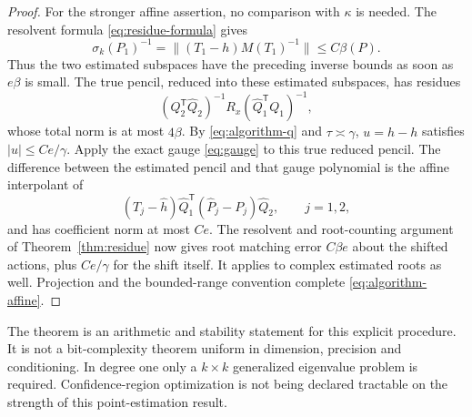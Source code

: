 \begin{proof}
For the stronger affine assertion, no comparison with $\kappa$ is
needed. The resolvent formula \eqref{eq:residue-formula} gives
\[
 \sigma_k(P_1)^{-1}
       =\|(T_1-h)M(T_1)^{-1}\|\le C\beta(P).
\]
Thus the two estimated subspaces have the preceding inverse bounds
as soon as $e\beta$ is small. The true pencil, reduced into these
estimated subspaces, has residues
\[
 (Q_2^{\mathsf T}\widehat Q_2)^{-1}R_x
                (\widehat Q_1^{\mathsf T}Q_1)^{-1},
\]
whose total norm is at most $4\beta$.
By \eqref{eq:algorithm-q} and $\tau\asymp\gamma$,
$u=\widehat h-h$ satisfies $|u|\le Ce/\gamma$.
Apply the exact gauge \eqref{eq:gauge} to this true reduced pencil.
The difference between the estimated pencil and that gauge polynomial
is the affine interpolant of
\[
 (T_j-\widehat h)\widehat Q_1^{\mathsf T}
                      (\widehat P_j-P_j)\widehat Q_2,
 \qquad j=1,2,
\]
and has coefficient norm at most $Ce$. The resolvent and root-counting
argument of Theorem~\ref{thm:residue} now gives root matching error
$C\beta e$ about the shifted actions, plus $Ce/\gamma$ for the
shift itself. It applies to complex estimated roots as well. Projection
and the bounded-range convention complete \eqref{eq:algorithm-affine}.
\end{proof}

The theorem is an arithmetic and stability statement for this explicit
procedure. It is not a bit-complexity theorem uniform in dimension,
precision and conditioning. In degree one only a $k\times k$
generalized eigenvalue problem is required. Confidence-region
optimization is not being declared tractable on the strength of this
point-estimation result.
